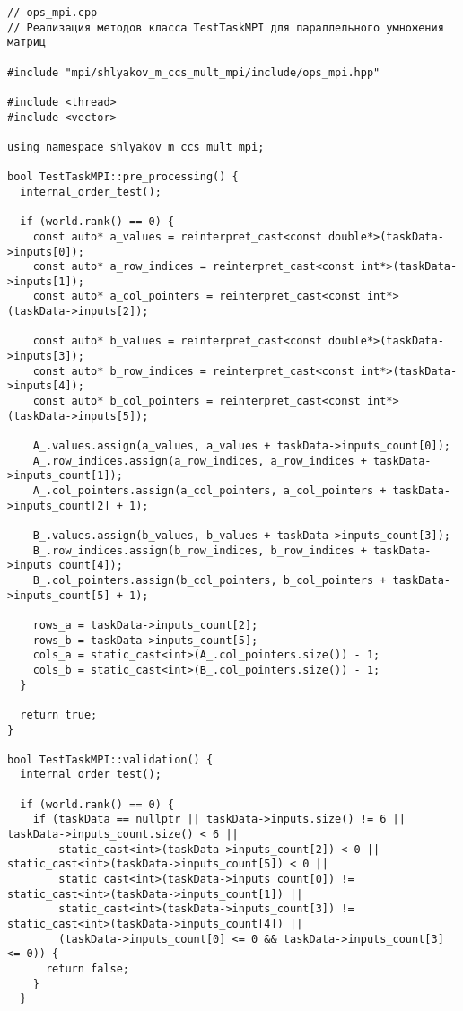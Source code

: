 \documentclass[12pt]{article}
\begin{document}
\begin{verbatim}
// ops_mpi.cpp
// Реализация методов класса TestTaskMPI для параллельного умножения матриц

#include "mpi/shlyakov_m_ccs_mult_mpi/include/ops_mpi.hpp"

#include <thread>
#include <vector>

using namespace shlyakov_m_ccs_mult_mpi;

bool TestTaskMPI::pre_processing() {
  internal_order_test();

  if (world.rank() == 0) {
    const auto* a_values = reinterpret_cast<const double*>(taskData->inputs[0]);
    const auto* a_row_indices = reinterpret_cast<const int*>(taskData->inputs[1]);
    const auto* a_col_pointers = reinterpret_cast<const int*>(taskData->inputs[2]);

    const auto* b_values = reinterpret_cast<const double*>(taskData->inputs[3]);
    const auto* b_row_indices = reinterpret_cast<const int*>(taskData->inputs[4]);
    const auto* b_col_pointers = reinterpret_cast<const int*>(taskData->inputs[5]);

    A_.values.assign(a_values, a_values + taskData->inputs_count[0]);
    A_.row_indices.assign(a_row_indices, a_row_indices + taskData->inputs_count[1]);
    A_.col_pointers.assign(a_col_pointers, a_col_pointers + taskData->inputs_count[2] + 1);

    B_.values.assign(b_values, b_values + taskData->inputs_count[3]);
    B_.row_indices.assign(b_row_indices, b_row_indices + taskData->inputs_count[4]);
    B_.col_pointers.assign(b_col_pointers, b_col_pointers + taskData->inputs_count[5] + 1);

    rows_a = taskData->inputs_count[2];
    rows_b = taskData->inputs_count[5];
    cols_a = static_cast<int>(A_.col_pointers.size()) - 1;
    cols_b = static_cast<int>(B_.col_pointers.size()) - 1;
  }

  return true;
}

bool TestTaskMPI::validation() {
  internal_order_test();

  if (world.rank() == 0) {
    if (taskData == nullptr || taskData->inputs.size() != 6 || taskData->inputs_count.size() < 6 ||
        static_cast<int>(taskData->inputs_count[2]) < 0 || static_cast<int>(taskData->inputs_count[5]) < 0 ||
        static_cast<int>(taskData->inputs_count[0]) != static_cast<int>(taskData->inputs_count[1]) ||
        static_cast<int>(taskData->inputs_count[3]) != static_cast<int>(taskData->inputs_count[4]) ||
        (taskData->inputs_count[0] <= 0 && taskData->inputs_count[3] <= 0)) {
      return false;
    }
  }


\end{verbatim}
\end{document}
